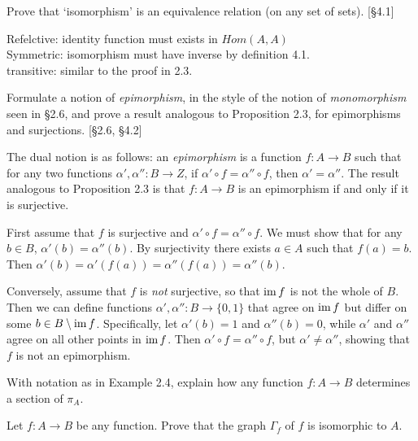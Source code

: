 \begin{enumerate}
\begin{solution}
    \item Prove that `isomorphism' is an equivalence relation (on any set of sets). [\S4.1]
        \begin{solution}
            Refelctive: identity function must exists in $Hom(A,A)$
            \\
            Symmetric: isomorphism must have inverse by definition 4.1.
            \\
            transitive: similar to the proof in 2.3. 
        \end{solution}
    \item Formulate a notion of \textit{epimorphism}, in the style of the notion of \textit{monomorphism} seen in \S2.6, and prove a result analogous to Proposition 2.3, for epimorphisms and surjections. [\S2.6, \S4.2]
        
          \begin{solution}
              The dual notion is as follows: an \textit{epimorphism} is a function $f: A \to B$ such that for any two functions $\alpha', \alpha'': B \to Z$, if $\alpha' \circ f = \alpha'' \circ f$, then $\alpha' = \alpha''$.
              The result analogous to Proposition 2.3 is that $f: A \to B$ is an epimorphism if and only if it is surjective.

              First assume that $f$ is surjective and $\alpha' \circ f = \alpha'' \circ f$. We must show that for any $b \in B$, $\alpha'(b) = \alpha''(b)$. By surjectivity there exists $a \in A$ such that $f(a) = b$. Then $\alpha'(b) = \alpha'(f(a)) = \alpha''(f(a)) = \alpha''(b)$.

              Conversely, assume that $f$ is \emph{not} surjective, so that $\operatorname{im} f$ is not the whole of $B$. Then we can define functions $\alpha',\alpha'': B \to \{0,1\}$ that agree on $\operatorname{im} f$ but differ on some $b \in B \setminus \operatorname{im} f$. Specifically, let $\alpha'(b) = 1$ and $\alpha''(b) = 0$, while $\alpha'$ and $\alpha''$ agree on all other points in $\operatorname{im} f$. Then $\alpha' \circ f = \alpha'' \circ f$, but $\alpha' \neq \alpha''$, showing that $f$ is not an epimorphism.
          \end{solution}

    \item With notation as in Example 2.4, explain how any function $f: A \to B$ determines a section of $\pi_A$.

    \item Let $f: A \to B$ be any function. Prove that the graph $\Gamma_f$ of $f$ is isomorphic to $A$.


\end{solution}
\end{enumerate}
